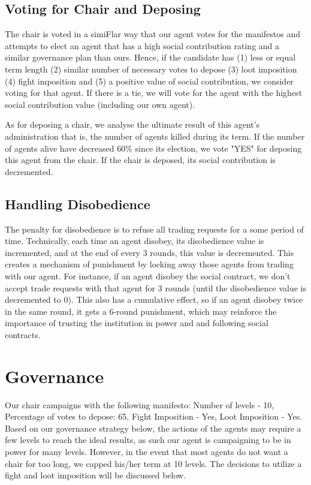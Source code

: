 \subsection{Voting for Chair and Deposing}

\par The chair is voted in a simiFlar way that our agent votes for the manifestos and attempts to elect an agent that has a high social contribution rating and a similar governance plan than ours. Hence, if the candidate has (1) less or equal term length (2) similar number of necessary votes to depose (3) loot imposition (4) fight imposition and (5) a positive value of social contribution, we consider voting for that agent. If there is a tie, we will vote for the agent with the highest social contribution value (including our own agent).

\par As for deposing a chair, we analyse the ultimate result of this agent's administration that is, the number of agents killed during its term. If the number of agents alive have decreased 60\% since its election, we vote "YES" for deposing this agent from the chair. If the chair is deposed, its social contribution is decremented.



\subsection{Handling Disobedience}

\par The penalty for disobedience is to refuse all trading requests for a some period of time. Technically, each time an agent disobey, its disobedience value is incremented, and at the end of every 3 rounds, this value is decremented. This creates a mechanism of punishment by locking away those agents from trading with our agent. For instance, if an agent disobey the social contract, we don't accept trade requests with that agent for 3 rounds (until the disobedience value is decremented to 0). This also has a cumulative effect, so if an agent disobey twice in the same round, it gets a 6-round punishment, which may reinforce the importance of trusting the institution in power and and following social contracts. 

\section{Governance}
\par Our chair campaigns with the following manifesto: Number of levels - 10, Percentage of votes to depose: 65, Fight Imposition - Yes, Loot Imposition - Yes. Based on our governance strategy below, the actions of the agents may require a few levels to reach the ideal results, as such our agent is campaigning to be in power for many levels. However, in the event that most agents do not want a chair for too long, we capped his/her term at 10 levels. The decisions to utilize a fight and loot imposition will be discussed below.
 
